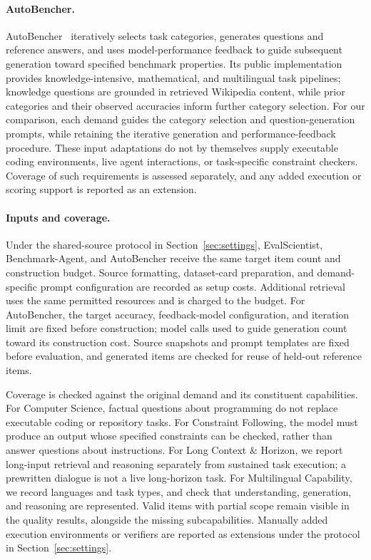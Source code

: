 \documentclass{article} %
\begin{document}
	\paragraph{AutoBencher.}
	AutoBencher~\citep{li2025autobencher} iteratively selects task categories,
	generates questions and reference answers, and uses model-performance feedback
	to guide subsequent generation toward specified benchmark properties. Its
	public implementation provides knowledge-intensive, mathematical, and
	multilingual task pipelines; knowledge questions are grounded in retrieved
	Wikipedia content, while prior categories and their observed accuracies inform
	further category selection. For our comparison, each demand guides the category
	selection and question-generation prompts, while retaining the iterative
	generation and performance-feedback procedure. These input adaptations do not
	by themselves supply executable coding environments, live agent interactions,
	or task-specific constraint checkers. Coverage of such requirements is assessed
	separately, and any added execution or scoring support is reported as an
	extension.
	
	\paragraph{Inputs and coverage.}
	Under the shared-source protocol in Section~\ref{sec:settings}, EvalScientist,
	Benchmark-Agent, and AutoBencher receive the same target item count and
	construction budget. Source formatting, dataset-card preparation, and
	demand-specific prompt configuration are recorded as setup costs. Additional
	retrieval uses the same permitted resources and is charged to the budget.
	For AutoBencher, the target accuracy, feedback-model configuration, and
	iteration limit are fixed before construction; model calls used to guide
	generation count toward its construction cost. Source snapshots and prompt
	templates are fixed before evaluation, and generated items are checked for
	reuse of held-out reference items.
	
	Coverage is checked against the original demand and its constituent
	capabilities. For Computer Science, factual questions about programming do not
	replace executable coding or repository tasks. For Constraint Following,
	the model must produce an output whose specified constraints can be checked,
	rather than answer questions about instructions. For Long Context \& Horizon,
	we report long-input retrieval and reasoning separately from sustained task
	execution; a prewritten dialogue is not a live long-horizon task. For
	Multilingual Capability, we record languages and task types, and check that
	understanding, generation, and reasoning are represented. Valid items with
	partial scope remain visible in the quality results, alongside the missing
	subcapabilities. Manually added execution environments or verifiers are
	reported as extensions under the protocol in Section~\ref{sec:settings}.
	
\end{document}
